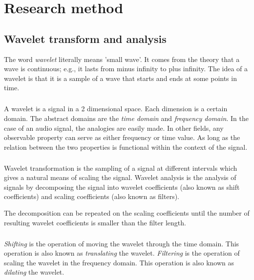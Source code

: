 \chapter{Research method}
\label{method}

\section{Wavelet transform and analysis}
The word \emph{wavelet }\rm literally means 'small wave'. It comes from the
theory that a wave is continuous; e.g., it lasts from minus infinity to plus
infinity. The idea of a wavelet is that it is a sample of a wave that starts
and ends at some points in time.

\paragraph{}
A wavelet is a signal in a 2 dimensional space. Each dimension is a certain
domain. The abstract domains are the \emph{time domain }\rm and \emph{frequency
domain}\rm. In the case of an audio signal, the analogies are easily made. In
other fields, any observable property can serve as either frequency or time
value. As long as the relation between the two properties is functional within
the context of the signal.

\paragraph{}
Wavelet transformation is the sampling of a signal at different intervals which
gives a natural means of scaling the signal. Wavelet analysis is the analysis of
signals by decomposing the signal into wavelet coefficients (also known as shift
coefficients) and scaling coefficients (also known as filters).

The decomposition can be repeated on the scaling coefficients until the number
of resulting wavelet coefficients is smaller than the filter length.

\paragraph{}
\emph{Shifting }\rm is the operation of moving the wavelet through the time
domain. This operation is also known as \emph{translating }\rm the wavelet.
\emph{Filtering }\rm is the operation of scaling the wavelet in the frequency
domain. This operation is also known as \emph{dilating }\rm the wavelet.

